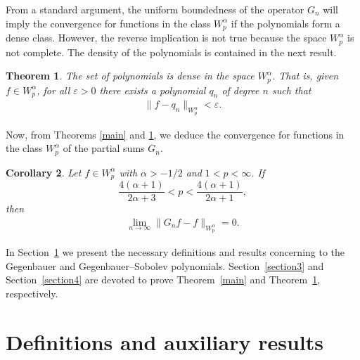 \documentclass[pdftex]{sigma}
\newtheorem{thm}{Theorem}[section]
\newtheorem{cor}[thm]{Corollary}
\numberwithin{equation}{section}
\begin{document}
From a standard argument, the uniform boundedness of the operator $G_n$ will imply the convergence for functions in the class $W_p^\alpha$ if the polynomials form a dense class. However, the reverse implication is not true because the space $W_p^{\alpha}$ is not complete. The density of the polynomials is contained in the next result.

\begin{thm}\label{density}
The set of polynomials is dense in the space $W_p^{\alpha}$. That is, given $f\in W_p^{\alpha}$, for all $\varepsilon>0$ there exists a polynomial $q_n$ of degree $n$ such that
\begin{gather*}
\|f-q_n\|_{W_p^{\alpha}}<\varepsilon.
\end{gather*}
\end{thm}

Now, from Theorems \ref{main} and \ref{density}, we deduce the convergence for functions in the class $W_p^{\alpha}$ of the partial sums $G_n$.

\begin{cor}Let $f\in W_p^{\alpha}$ with $\alpha>-1/2$ and $1<p<\infty$. If
	\begin{equation*}
	\frac{4(\alpha+1)}{2\alpha+3}<p<\frac{4(\alpha+1)}{2\alpha+1},
	\end{equation*}
then
\begin{gather*}
 \lim_{n\to\infty}\|G_nf-f\|_{W_p^{\alpha}}=0.
\end{gather*}
\end{cor}

In Section~\ref{section2} we present the necessary definitions and results concerning to the Gegenbauer and Gegenbauer--Sobolev polynomials. Section~\ref{section3} and Section~\ref{section4} are devoted to prove Theorem~\ref{main} and Theorem~\ref{density}, respectively.

\section{Definitions and auxiliary results}\label{section2}
\end{document}
